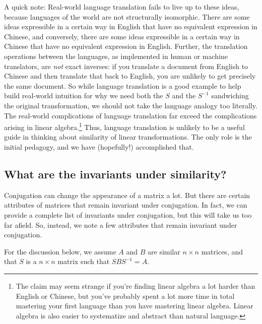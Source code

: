 \documentclass[10pt]{amsart}
\begin{document}
A quick note: Real-world language translation fails to live up to
these ideas, because languages of the world are not structurally
isomorphic. There are some ideas expressible in a certain way in
English that have no equivalent expression in Chinese, and conversely,
there are some ideas expressible in a certain way in Chinese that have
no equivalent expression in English. Further, the translation
operations between the languages, as implemented in human or machine
translators, are {\em not} exact inverses: if you translate a document
from English to Chinese and then translate that back to English, you
are unlikely to get precisely the same document. So while language
translation is a good example to help build real-world intuition for
why we need both the $S$ and the $S^{-1}$ sandwiching the original
transformation, we should not take the language analogy too
literally. The real-world complications of language translation far
exceed the complications arising in linear algebra.\footnote{The claim
  may seem strange if you're finding linear algebra a lot harder than
  English or Chinese, but you've probably spent a lot more time in
  total mastering your first language than you have mastering linear
  algebra. Linear algebra is also easier to systematize and abstract
  than natural language.} Thus, language translation is unlikely to be
a useful guide in thinking about similarity of linear
transformations. The only role is the initial pedagogy, and we have
(hopefully!) accomplished that.

\subsection{What are the invariants under similarity?}

Conjugation can change the appearance of a matrix a lot. But there are
certain attributes of matrices that remain invariant under
conjugation. In fact, we can provide a complete list of invariants
under conjugation, but this will take us too far afield. So, instead,
we note a few attributes that remain invariant under conjugation.

For the discussion below, we assume $A$ and $B$ are similar $n \times
n$ matrices, and that $S$ is a $n \times n$ matrix such that $SBS^{-1}
= A$.
\end{document}
